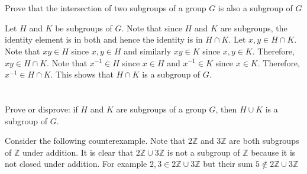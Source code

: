 \documentclass[a4paper]{article}
\begin{document}
\section{}


\section{}

Prove that the intersection of two subgroups of a group $G$ is also a subgroup of $G$

\vspace{\baselineskip}

Let $H$ and $K$ be subgroups of $G$. Note that since $H$ and $K$ are subgroups, the identity element is in both and hence the identity is in $H \cap K$. Let $x,y \in H \cap K$. Note that $xy \in H$ since $x,y \in H$ and similarly $xy \in K$ since $x,y \in K$. Therefore, $xy \in H \cap K$. Note that $x^{-1} \in H$ since $x \in H$ and $x^{-1} \in K$ since $x \in K$. Therefore, $x^{-1} \in H \cap K$. This shows that $H \cap K$ is a subgroup of $G$.



\section{}

Prove or disprove: if $H$ and $K$ are subgroups of a group $G$, then $H \cup K$ is a subgroup of $G$.

\vspace{\baselineskip}

Consider the following counterexample. Note that $2\mathbb{Z}$ and $3\mathbb{Z}$ are both subgroups of $\mathbb{Z}$ under addition. It is clear that $2\mathbb{Z} \cup 3\mathbb{Z}$ is not a subgroup of $\mathbb{Z}$ because it is not closed under addition. For example $2,3 \in 2\mathbb{Z} \cup 3\mathbb{Z}$ but their sum $5 \not\in 2\mathbb{Z} \cup 3\mathbb{Z}$


\section{}


\section{}


\section{}
\end{document}
